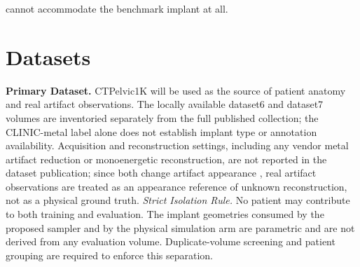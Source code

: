 \documentclass[9pt]{extarticle}
\begin{document}
cannot accommodate the benchmark implant at all.

\section{Datasets}

\textbf{Primary Dataset.} CTPelvic1K \citep{liu2021ctpelvic1k} will be used as the source of patient anatomy and real artifact observations. The locally available dataset6 and dataset7 volumes are inventoried separately from the full published collection; the CLINIC-metal label alone does not establish implant type or annotation availability. Acquisition and reconstruction settings, including any vendor metal artifact reduction or monoenergetic reconstruction, are not reported in the dataset publication; since both change artifact appearance \citep{selles2024marreview}, real artifact observations are treated as an appearance reference of unknown reconstruction, not as a physical ground truth. \emph{Strict Isolation Rule.} No patient may contribute to both training and evaluation. The implant geometries consumed by the proposed sampler and by the physical simulation arm are parametric and are not derived from any evaluation volume. Duplicate-volume screening and patient grouping are required to enforce this separation.
\end{document}

